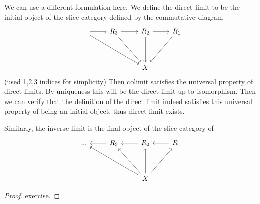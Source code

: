 \begin{remark}
    We can use a different formulation here. We define the direct limit to be the initial object of the slice category defined by the commutative diagram%
\[\begin{tikzcd}
	{...} & {R_3} & {R_2} & {R_1} \\
	\\
	&& X
	\arrow[from=1-1, to=1-2]
	\arrow[from=1-1, to=3-3]
	\arrow[from=1-2, to=1-3]
	\arrow[from=1-2, to=3-3]
	\arrow[from=1-3, to=1-4]
	\arrow[from=1-3, to=3-3]
	\arrow[from=1-4, to=3-3]
\end{tikzcd}\]
(used 1,2,3 indices for simplicity) Then colimit satisfies the universal property of direct limits. By uniqueness this will be the direct limit up to isomorphism. Then we can verify that the definition of the direct limit indeed satisfies this universal property of being an initial object, thus direct limit exists.



Similarly, the inverse limit is the final object of the slice category of 
\[\begin{tikzcd}
	{...} & {R_3} & {R_2} & {R_1} \\
	\\
	&& X
	\arrow[from=1-2, to=1-1]
	\arrow[from=1-3, to=1-2]
	\arrow[from=1-4, to=1-3]
	\arrow[from=3-3, to=1-1]
	\arrow[from=3-3, to=1-2]
	\arrow[from=3-3, to=1-3]
	\arrow[from=3-3, to=1-4]
\end{tikzcd}\]
\end{remark}



\begin{proof}
    exercise. 
\end{proof}

